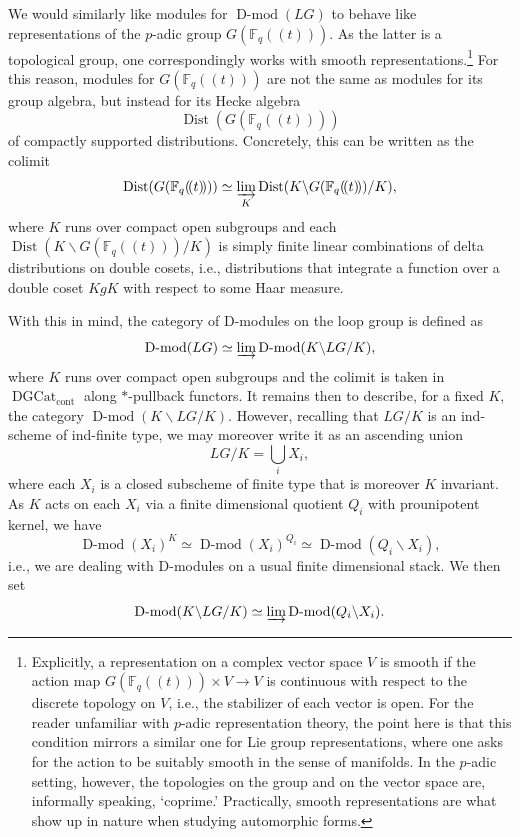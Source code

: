 \documentclass[10pt]{amsart}
\newcommand{\Fqt}{\Fq(\!(t)\!)}
\newcommand{\on}{\operatorname}
\newcommand{\Dmod}{\on{D-mod}}
\newcommand{\Fq}{\mathbb{F}_q}
\theoremstyle{remark}
\numberwithin{equation}{section}
\newcommand{\msf}{\operatorname}
\newcommand{\DGCat}{\msf{DGCat}_{\on{cont}}}
\begin{document}
     We would similarly like modules for $\Dmod(LG)$ to 
	behave like representations of the $p$-adic group $G(\Fqt)$. As the latter 
	is a topological group, one correspondingly works with smooth 
	representations.\footnote{Explicitly,  a representation on a complex vector space $V$ is smooth if the action map $G(\Fqt) 
	\times V \rightarrow V$ is continuous with respect to the discrete 
	topology on $V$, i.e., the stabilizer of each vector is open. For the reader 
	unfamiliar with $p$-adic representation theory, the point here is that this condition mirrors a similar one for Lie 
	group representations, where one asks for the action to be suitably smooth in the sense of manifolds. In the $p$-adic setting, however, the 
	topologies on the group and on the vector space are, 
	informally speaking, `coprime.' Practically, smooth representations are what show up in 
	nature when studying automorphic forms.} For this reason, modules for $G(\Fqt)$ are not the same as modules for its group algebra, but instead for 
	its Hecke algebra 
	$$\on{Dist}(G(\Fqt)) $$
	of compactly supported distributions. Concretely, this can be written as 
	the 
	colimit 
	\begin{equation} \label{e:padicgroups}
	\on{Dist}(G(\Fqt))\simeq \varinjlim_K  \on{Dist}( K \backslash G(\Fqt) / K),
	\end{equation}
	where $K$ runs over compact open subgroups and each $\on{Dist}( K \backslash 
	G(\Fqt) / K)$ is simply finite linear combinations of delta distributions on 
	double cosets, i.e., distributions that integrate a function over a double 
	coset $KgK$ with respect to some Haar measure. 
	
	
	With this in mind, the category of D-modules on the loop group is defined 
	as 
	\[
	\Dmod(LG) \simeq \varinjlim \Dmod(K \backslash LG / K),
	\]
	where $K$ runs over compact open subgroups and the colimit is taken in 
	$\DGCat$ along $*$-pullback functors. It remains then to describe, for 
	a fixed $K$, the category 
	$\Dmod(K\backslash LG/K)$. However, recalling that  $LG/K$ is an ind-scheme 
	of ind-finite type, we may moreover write it as an ascending union 
	\[
	   LG/K = \bigcup_i X_i,
	\]
	where each $X_i$ is a closed subscheme of finite type that is moreover $K$ 
	invariant. As $K$ acts on each $X_i$ via a finite dimensional quotient $Q_i$ 
	with prounipotent kernel, we have 
	\[
	   \Dmod(X_i)^K \simeq \Dmod(X_i)^{Q_i} \simeq \Dmod(Q_i \backslash X_i),
	\]
	i.e., we are dealing with D-modules on a usual finite dimensional stack. We then 
	set 
	\[
	  \Dmod(K \backslash LG/K) \simeq \varinjlim \Dmod( Q_i \backslash X_i). 
	\]
	
\end{document}

